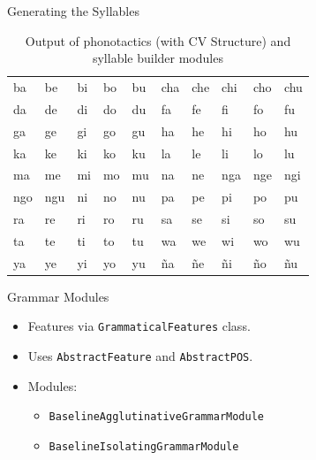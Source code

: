 \documentclass{beamer}
\begin{document}
\begin{frame}{Generating the Syllables}
	
	\begin{table}[h!]
		\centering
		\begin{tabular}{llllllllll}

			ba & be & bi & bo & bu & cha & che & chi & cho & chu \\
			da & de & di & do & du & fa & fe & fi & fo & fu \\
			ga & ge & gi & go & gu & ha & he & hi & ho & hu \\
			ka & ke & ki & ko & ku & la & le & li & lo & lu \\
			ma & me & mi & mo & mu & na & ne & nga & nge & ngi \\
			ngo & ngu & ni & no & nu & pa & pe & pi & po & pu \\
			ra & re & ri & ro & ru & sa & se & si & so & su \\
			ta & te & ti & to & tu & wa & we & wi & wo & wu \\
			ya & ye & yi & yo & yu & ña & ñe & ñi & ño & ñu \\

		\end{tabular}
		\caption{Output of phonotactics (with CV Structure) and syllable builder modules}
	\end{table}

\end{frame}

\begin{frame}{Grammar Modules}
	\begin{itemize}
		\item Features via \texttt{GrammaticalFeatures} class.
		\item Uses \texttt{AbstractFeature} and \texttt{AbstractPOS}.
		\item Modules:
		\begin{itemize}
			\item \texttt{BaselineAgglutinativeGrammarModule}
			\item \texttt{BaselineIsolatingGrammarModule}
		\end{itemize}
	\end{itemize}
\end{frame}
\end{document}
